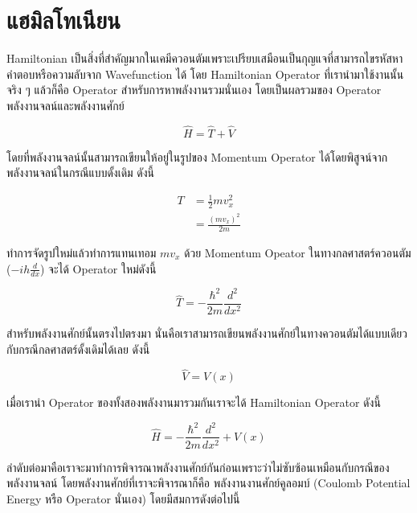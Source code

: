 \section{แฮมิลโทเนียน}
\label{sec:hamiltonian}

Hamiltonian เป็นสิ่งที่สำคัญมากในเคมีควอนตัมเพราะเปรียบเสมือนเป็นกุญแจที่สามารถไขรหัสหาคำตอบหรือความลับจาก Wavefunction ได้
โดย Hamiltonian Operator ที่เรานำมาใช้งานนั้นจริง ๆ แล้วก็คือ Operator สำหรับการหาพลังงานรวมนั่นเอง โดยเป็นผลรวมของ Operator 
พลังงานจลน์และพลังงานศักย์

\begin{equation}\label{eq:hamil}
    \hat{H} = \hat{T} + \hat{V}
\end{equation}

\noindent โดยที่พลังงานจลน์นั้นสามารถเขียนให้อยู่ในรูปของ Momentum Operator ได้โดยพิสูจน์จากพลังงานจลน์ในกรณีแบบดั้งเดิม ดังนี้

\begin{align}
    T &= \frac{1}{2}mv^{2}_{x} \\
      &= \frac{(mv_{x})^{2}}{2m}
\end{align}

\noindent ทำการจัดรูปใหม่แล้วทำการแทนเทอม $mv_{x}$ ด้วย Momentum Opeator ในทางกลศาสตร์ควอนตัม ($-ih\frac{d}{dx}$) 
จะได้ Operator ใหม่ดังนี้

\begin{equation}
    \hat{T} = -\frac{\hbar^{2}}{2m}\frac{d^{2}}{dx^{2}}
\end{equation}

สำหรับพลังงานศักย์นั้นตรงไปตรงมา นั่นคือเราสามารถเขียนพลังงานศักย์ในทางควอนตัมได้แบบเดียวกับกรณีกลศาสตร์ดั้งเดิมได้เลย ดังนี้

\begin{equation}
    \hat{V} = V(x)
\end{equation}

เมื่อเรานำ Operator ของทั้งสองพลังงานมารวมกันเราจะได้ Hamiltonian Operator ดังนี้

\begin{equation}
    \hat{H} = -\frac{\hbar^{2}}{2m}\frac{d^{2}}{dx^{2}} + V(x)
\end{equation}

ลำดับต่อมาคือเราจะมาทำการพิจารณาพลังงานศักย์กันก่อนเพราะว่าไม่ซับซ้อนเหมือนกับกรณีของพลังงานจลน์ โดยพลังงานศักย์ที่เราจะพิจารณาก็คือ%
พลังงานงานศักย์คูลอมบ์ (Coulomb Potential Energy หรือ Operator นั่นเอง) โดยมีสมการดังต่อไปนี้

